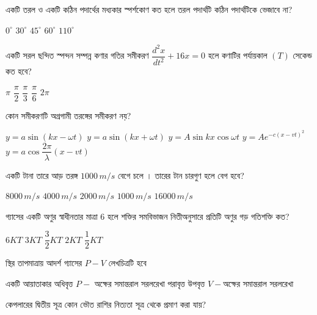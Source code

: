 \documentclass[addpoints]{exam}
\begin{document}
\begin{questions}
\question একটি তরল ও একটি কঠিন পদার্থের মধ্যকার স্পর্শকোণ কত হলে তরল পদার্থটি কঠিন পদার্থটিকে ভেজাবে না?

\begin{oneparchoices}
\choice $ 0^{\circ} $
\choice $ 30^{\circ} $
\choice $ 45^{\circ} $
\choice  $ 60^{\circ} $
\choice $ 110^{\circ} $
\end{oneparchoices}

\question  একটি সরল ছন্দিত স্পন্দন সম্পন্ন কণার গতির সমীকরণ $ \dfrac{d^{2}x}{dt^{2}} + 16x =0 $ হলে কণাটির পর্যায়কাল $ (T) $ সেকেন্ড কত হবে?

\begin{oneparchoices}
\choice $ \pi $
\choice $ \dfrac{\pi}{2} $
\choice $ \dfrac{\pi}{3} $
\choice $ \dfrac{\pi}{6} $
\choice $ 2\pi $
\end{oneparchoices}

\question  কোন সমীকরণটি অগ্রগামী তরঙ্গের সমীকরণ নয়?

\begin{oneparchoices}
\choice  $y = a\sin (kx-\omega t) $
\choice  $y = a\sin (kx+\omega t) $
\choice  $y = A\sin kx\cos \omega t $
\choice $ y = Ae^{-c(x-vt)^{2}} $
\choice  $y = a\cos \dfrac{2\pi}{\lambda}(x-vt) $
\end{oneparchoices}


\question   একটি টানা তারে আড় তরঙ্গ $ 1000\, m/s $ বেগে চলে । তারের টান চারগুণ হলে বেগ হবে?

\begin{oneparchoices}
\choice $ 8000\, m/s $ 
\choice $ 4000\, m/s $ 
\choice $ 2000\, m/s $ 
\choice $ 1000\, m/s $ 
\choice $ 16000\, m/s $ 
\end{oneparchoices}

\question  গ্যাসের একটি অণুর স্বাধীনতার মাত্রা $ 6 $ হলে শক্তির সমবিভাজন নিতীঅনুসারে প্রতিটি অণুর গড় গতিশক্তি কত?

\begin{oneparchoices}
\choice $ 6KT $
\choice $ 3KT $
\choice $ \dfrac{3}{2}KT $
\choice $ 2KT $
\choice $ \dfrac{1}{2}KT $
\end{oneparchoices}

\question  স্থির তাপমাত্রায় আদর্শ গ্যাসের $ P-V $ লেখচিত্রটি হবে 

\begin{oneparchoices}
\choice একটি আয়াতাকার অধিবৃত্ত 
\choice $ P- $ অক্ষের সমান্তরাল সরলরেখা 
\choice পরাবৃত্ত 
\choice উপবৃত্ত 
\choice $ V- $অক্ষের সমান্তরাল সরলরেখা
\end{oneparchoices}

\question   কেপলারের দ্বিতীয় সূত্র কোন ভৌত রাশির নিত্যতা সূত্র থেকে প্রমাণ করা যায়? 



\end{questions}
\end{document}
